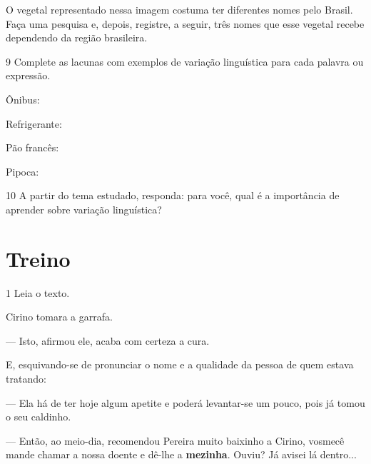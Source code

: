 O vegetal representado nessa imagem costuma ter diferentes nomes pelo Brasil.
Faça uma pesquisa e, depois, registre, a seguir, três nomes que esse vegetal recebe dependendo da região brasileira.


\num{9} Complete as lacunas com exemplos de variação linguística para cada palavra ou expressão.

\begin{escolha}
\item Ônibus: 

\item Refrigerante: 

\item Pão francês:

\item Pipoca: 
\end{escolha}


\num{10} A partir do tema estudado, responda: para você, qual é a importância de
aprender sobre variação linguística?


\section*{Treino}

\num{1} Leia o texto.

\begin{myquote}
Cirino tomara a garrafa.

— Isto, afirmou ele, acaba com certeza a cura.

E, esquivando-se de pronunciar o nome e a qualidade da pessoa de quem
estava tratando:

— Ela há de ter hoje algum apetite e poderá levantar-se um pouco, pois
já tomou o seu caldinho.

— Então, ao meio-dia, recomendou Pereira muito baixinho a Cirino,
vosmecê mande chamar a nossa doente e dê-lhe a \textbf{mezinha}. Ouviu?
Já avisei lá dentro...

\end{myquote}


